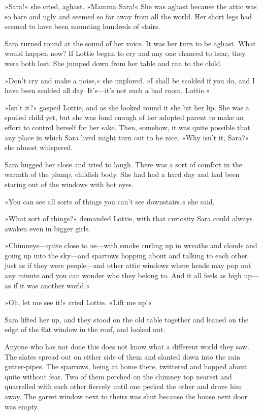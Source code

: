 »Sara!« she cried, aghast. »Mamma Sara!« She was aghast because the attic was so bare and ugly and seemed so far away from all the world. Her short legs had seemed to have been mounting hundreds of stairs.

Sara turned round at the sound of her voice. It was her turn to be aghast. What would happen now? If Lottie began to cry and any one chanced to hear, they were both lost. She jumped down from her table and ran to the child.

»Don't cry and make a noise,« she implored. »I shall be scolded if you do, and I have been scolded all day. It's—it's not such a bad room, Lottie.«

»Isn't it?« gasped Lottie, and as she looked round it she bit her lip. She was a spoiled child yet, but she was fond enough of her adopted parent to make an effort to control herself for her sake. Then, somehow, it was quite possible that any place in which Sara lived might turn out to be nice. »Why isn't it, Sara?« she almost whispered.

Sara hugged her close and tried to laugh. There was a sort of comfort in the warmth of the plump, childish body. She had had a hard day and had been staring out of the windows with hot eyes.

»You can see all sorts of things you can't see downstairs,« she said.

»What sort of things?« demanded Lottie, with that curiosity Sara could always awaken even in bigger girls.

»Chimneys—quite close to us—with smoke curling up in wreaths and clouds and going up into the sky—and sparrows hopping about and talking to each other just as if they were people—and other attic windows where heads may pop out any minute and you can wonder who they belong to. And it all feels as high up—as if it was another world.«

»Oh, let me see it!« cried Lottie. »Lift me up!«

Sara lifted her up, and they stood on the old table together and leaned on the edge of the flat window in the roof, and looked out.

Anyone who has not done this does not know what a different world they saw. The slates spread out on either side of them and slanted down into the rain gutter-pipes. The sparrows, being at home there, twittered and hopped about quite without fear. Two of them perched on the chimney top nearest and quarrelled with each other fiercely until one pecked the other and drove him away. The garret window next to theirs was shut because the house next door was empty.

